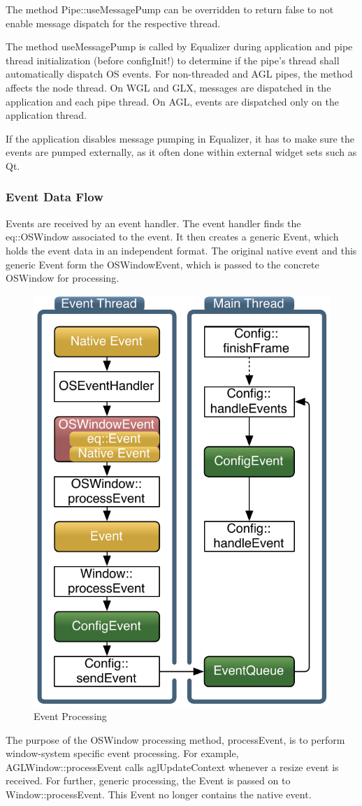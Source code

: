 \documentclass[10pt,a4]{scrartcl}
\begin{document}
The method \textsf{Pipe::useMessagePump} can be overridden to return
\textsf{false} to not enable message dispatch for the respective thread.

The method \textsf{useMessagePump} is called by Equalizer during
application and pipe thread initialization (before configInit!) to
determine if the pipe's thread shall automatically dispatch OS
events. For non-threaded and AGL pipes, the method affects the node
thread. On WGL and GLX, messages are dispatched in the application and
each pipe thread. On AGL, events are dispatched only on the application
thread.

If the application disables message pumping in Equalizer, it has to make
sure the events are pumped externally, as it often done within external
widget sets such as Qt.

\subsubsection{Event Data Flow}

Events are received by an event handler. The event handler finds the
\textsf{eq::OSWindow} associated to the event. It then creates a generic
\textsf{Event}, which holds the event data in an independent
format. The original native event and this generic \textsf{Event}
form the \textsf{OSWindowEvent}, which is passed to the concrete
\textsf{OSWindow} for processing.

\begin{figure}
  \includegraphics[width=.382\textwidth]{images/eventFilter.pdf}
  {\caption{\small\label{fEventProcessing}Event Processing}}
\end{figure}
The purpose of the \textsf{OSWindow} processing method,
\textsf{processEvent}, is to perform window-system specific event
processing. For example, \textsf{AGLWindow::processEvent} calls
\textsf{aglUpdateContext} whenever a resize event is received. For
further, generic processing, the \textsf{Event} is passed on to
\textsf{Window::processEvent}. This \textsf{Event} no longer contains
the native event.
\end{document}
